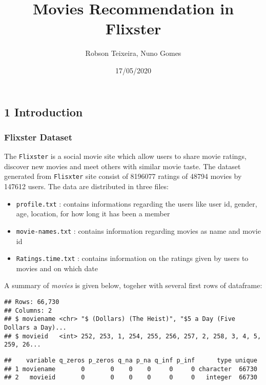 \documentclass[
  12pt,
]{report}
\title{Movies Recommendation in Flixster}
\author{Robson Teixeira, Nuno Gomes}
\date{17/05/2020}
\begin{document}
\maketitle

{
\hypersetup{linkcolor=}
\setcounter{tocdepth}{2}
\tableofcontents
}
\hypertarget{introduction}{%
\subsection{1 Introduction}\label{introduction}}

\hypertarget{flixster-dataset}{%
\subsubsection{Flixster Dataset}\label{flixster-dataset}}

The \texttt{Flixster} is a social movie site which allow users to share
movie ratings, discover new movies and meet others with similar movie
taste. The dataset generated from \texttt{Flisxter} site consist of
8196077 ratings of 48794 movies by 147612 users. The data are
distributed in three files:

\begin{itemize}
\item
  \texttt{profile.txt} : contains informations regarding the users like
  user id, gender, age, location, for how long it has been a member
\item
  \texttt{movie-names.txt} : contains information regarding movies as
  name and movie id
\item
  \texttt{Ratings.time.txt} : contains information on the ratings given
  by users to movies and on which date
\end{itemize}

A summary of \emph{movies} is given below, togeher with several first
rows of dataframe:

\begin{verbatim}
## Rows: 66,730
## Columns: 2
## $ moviename <chr> "$ (Dollars) (The Heist)", "$5 a Day (Five Dollars a Day)...
## $ movieid   <int> 252, 253, 1, 254, 255, 256, 257, 2, 258, 3, 4, 5, 259, 26...
\end{verbatim}

\begin{verbatim}
##    variable q_zeros p_zeros q_na p_na q_inf p_inf      type unique
## 1 moviename       0       0    0    0     0     0 character  66730
## 2   movieid       0       0    0    0     0     0   integer  66730
\end{verbatim}
\end{document}
